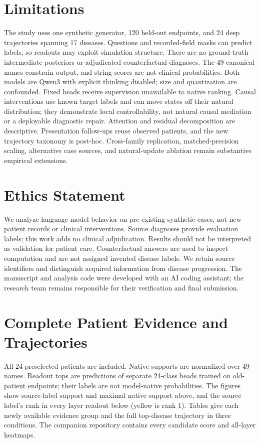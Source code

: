 \documentclass[11pt]{article}
\begin{document}
\section*{Limitations}
The study uses one synthetic generator, 120 held-out endpoints, and 24 deep trajectories spanning 17 diseases. Questions and recorded-field masks can predict labels, so readouts may exploit simulation structure. There are no ground-truth intermediate posteriors or adjudicated counterfactual diagnoses. The 49 canonical names constrain output, and string scores are not clinical probabilities. Both models are Qwen3 with explicit thinking disabled; size and quantization are confounded. Fixed heads receive supervision unavailable to native ranking. Causal interventions use known target labels and can move states off their natural distribution; they demonstrate local controllability, not natural causal mediation or a deployable diagnostic repair. Attention and residual decomposition are descriptive. Presentation follow-ups reuse observed patients, and the new trajectory taxonomy is post-hoc. Cross-family replication, matched-precision scaling, alternative case sources, and natural-update ablation remain substantive empirical extensions.

\section*{Ethics Statement}
We analyze language-model behavior on pre-existing synthetic cases, not new patient records or clinical interventions. Source diagnoses provide evaluation labels; this work adds no clinical adjudication. Results should not be interpreted as validation for patient care. Counterfactual answers are used to inspect computation and are not assigned invented disease labels. We retain source identifiers and distinguish acquired information from disease progression. The manuscript and analysis code were developed with an AI coding assistant; the research team remains responsible for their verification and final submission.



\clearpage
\appendix

\clearpage\onecolumn
\section{Complete Patient Evidence and Trajectories}\label{app:cases}
All 24 preselected patients are included. Native supports are normalized over 49 names. Readout tops are predictions of separate 24-class heads trained on old-patient endpoints; their labels are not model-native probabilities. The figures show source-label support and maximal native support above, and the source label's rank in every layer readout below (yellow is rank 1). Tables give each newly available evidence group and the full top-disease trajectory in three conditions. The companion repository contains every candidate score and all-layer heatmaps.

\end{document}

